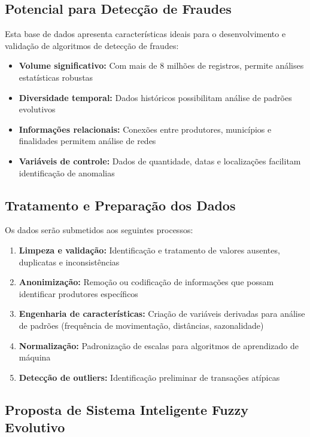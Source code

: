 \subsection{Potencial para Detecção de Fraudes}
Esta base de dados apresenta características ideais para o desenvolvimento e validação de algoritmos de detecção de fraudes:

\begin{itemize}
\item \textbf{Volume significativo:} Com mais de 8 milhões de registros, permite análises estatísticas robustas
\item \textbf{Diversidade temporal:} Dados históricos possibilitam análise de padrões evolutivos
\item \textbf{Informações relacionais:} Conexões entre produtores, municípios e finalidades permitem análise de redes
\item \textbf{Variáveis de controle:} Dados de quantidade, datas e localizações facilitam identificação de anomalias
\end{itemize}


\subsection{Tratamento e Preparação dos Dados}
Os dados serão submetidos aos seguintes processos:
\begin{enumerate}
    \item \textbf{Limpeza e validação:} Identificação e tratamento de valores ausentes, duplicatas e inconsistências
    \item \textbf{Anonimização:} Remoção ou codificação de informações que possam identificar produtores específicos
    \item \textbf{Engenharia de características:} Criação de variáveis derivadas para análise de padrões (frequência de movimentação, distâncias, sazonalidade)
    \item \textbf{Normalização:} Padronização de escalas para algoritmos de aprendizado de máquina
    \item \textbf{Detecção de outliers:} Identificação preliminar de transações atípicas
\end{enumerate}

\subsection{Proposta de Sistema Inteligente Fuzzy Evolutivo}

